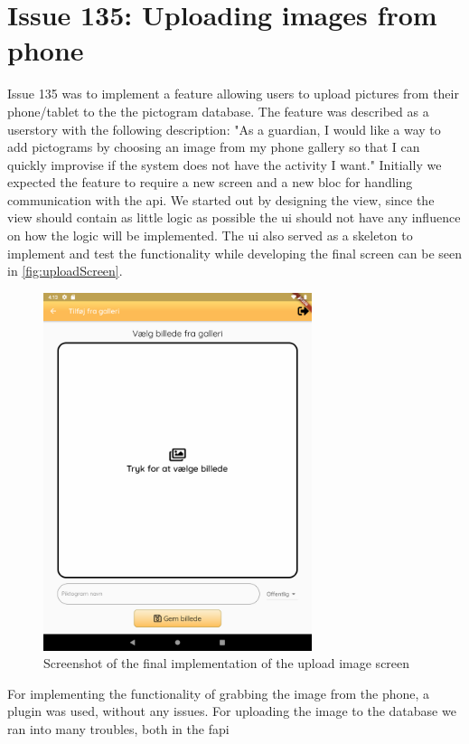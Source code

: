 \section{Issue 135: Uploading images from phone}

Issue 135 was to implement a feature allowing users to upload pictures from their phone/tablet to the the pictogram database. The feature was described as a userstory with the following description: "As a guardian, I would like a way to add pictograms by choosing an image from my phone gallery so that I can quickly improvise if the system does not have the activity I want." 
Initially we expected the feature to require a new screen and a new \gls{bloc} for handling communication with the api. We started out by designing the view, since the view should contain as little logic as possible the \gls{ui} should not have any influence on how the logic will be implemented. The \gls{ui} also served as a skeleton to implement and test the functionality while developing the final screen can be seen in \autoref{fig:uploadScreen}.

\begin{figure}[!h]
  \centering
  \includegraphics[width=0.7\textwidth]{figures/uploadPictogramScreen.png}
  \caption{Screenshot of the final implementation of the upload image screen}
  \label{fig:uploadScreen}
\end{figure}

For implementing the functionality of grabbing the image from the phone, a plugin was used, without any issues.
For uploading the image to the database we ran into many troubles, both in the \gls{fapi} 